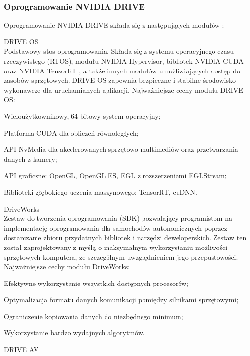 \subsubsection{Oprogramowanie NVIDIA DRIVE}
Oprogramowanie NVIDIA DRIVE składa się z następujących modułów \cite{nvidiaDrive:sdk}:
\begin{enumerate*}
\item DRIVE OS \\
Podstawowy stos oprogramowania. Składa się z systemu operacyjnego czasu rzeczywistego (RTOS), modułu NVIDIA Hypervisor, bibliotek NVIDIA CUDA oraz NVIDIA TensorRT \cite{nvidia:tensorRt}, a także innych modułów umożliwiających dostęp do zasobów sprzętowych. DRIVE OS zapewnia bezpieczne i stabilne środowisko wykonawcze dla uruchamianych aplikacji. Najważniejsze cechy modułu DRIVE OS:
\begin{itemize*}
\item Wieloużytkownikowy, 64-bitowy system operacyjny;
\item Platforma CUDA dla obliczeń równoległych;
\item API NvMedia dla akcelerowanych sprzętowo multimediów oraz przetwarzania danych z kamery;
\item API graficzne: OpenGL, OpenGL ES, EGL z rozszerzeniami EGLStream;
\item Biblioteki głębokiego uczenia maszynowego: TensorRT, cuDNN.
\end{itemize*}
\item DriveWorks \\
Zestaw do tworzenia oprogramowania (SDK) pozwalający programistom na implementację oprogramowania dla samochodów autonomicznych poprzez dostarczanie zbioru przydatnych bibliotek i narzędzi deweloperskich. Zestaw ten został zaprojektowany z myślą o maksymalnym wykorzystaniu możliwości sprzętowych komputera, ze szczególnym uwzględnieniem jego przepustowości. \\
Najważniejsze cechy modułu DriveWorks:
\begin{itemize*}
\item Efektywne wykorzystanie wszystkich dostępnych procesorów;
\item Optymalizacja formatu danych komunikacji pomiędzy silnikami sprzętowymi;
\item Ograniczenie kopiowania danych do niezbędnego minimum;
\item Wykorzystanie bardzo wydajnych algorytmów.
\end{itemize*}
\item DRIVE AV \\

\end{enumerate*}
